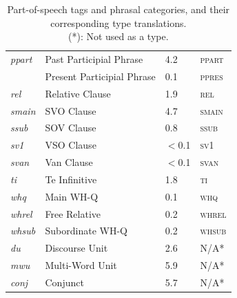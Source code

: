 \begin{table}
\begin{center}
\begin{tabularx}{1\linewidth}{usss}
      \textit{ppart} & Past Participial Phrase & 4.2 & \textsc{ppart}\\
       & Present Participial Phrase & 0.1 & \textsc{ppres}\\
      \textit{rel} & Relative Clause & 1.9 & \textsc{rel}\\
      \textit{smain} & SVO Clause & 4.7 & \textsc{smain}\\
      \textit{ssub} & SOV Clause & 0.8 & \textsc{ssub}\\
      \textit{sv1} & VSO Clause & $<$0.1& \textsc{sv1}\\
      \textit{svan} & Van Clause & $<$0.1 &\textsc{svan}\\
      \textit{ti} & Te Infinitive & 1.8 &\textsc{ti}\\
      \textit{whq} & Main WH-Q & 0.1 & \textsc{whq}\\
      \textit{whrel} & Free Relative & 0.2 &\textsc{whrel}\\
      \textit{whsub} & Subordinate WH-Q & 0.2 & \textsc{whsub}\\
      \textit{du} & Discourse Unit & 2.6 & N/A*\\
      \textit{mwu} & Multi-Word Unit & 5.9 & N/A*\\
      \textit{conj} & Conjunct & 5.7 & N/A*\\
      \midrule[0.005pt]
\end{tabularx}
\end{center}
\caption[Extracted Atomic Types]{Part-of-speech tags and phrasal categories, and their corresponding type translations.\\ (*): Not used as a type.}
\label{table:lex}
\end{table}

